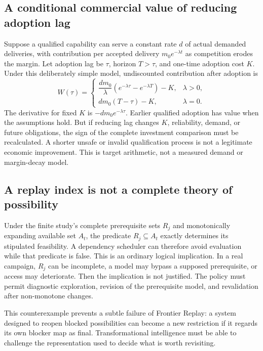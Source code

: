 \documentclass[11pt,letterpaper]{article}
\theoremstyle{remark}\newtheorem{remark}{Remark}[section]
\begin{document}
\subsection{A conditional commercial value of reducing adoption lag}
Suppose a qualified capability can serve a constant rate $d$ of actual demanded deliveries, with contribution per accepted delivery $m_0e^{-\lambda t}$ as competition erodes the margin. Let adoption lag be $\tau$, horizon $T>\tau$, and one-time adoption cost $K$. Under this deliberately simple model, undiscounted contribution after adoption is
\begin{equation}
W(\tau)=\begin{cases}
\dfrac{d m_0}{\lambda}\left(e^{-\lambda\tau}-e^{-\lambda T}\right)-K,&\lambda>0,\\[5pt]
dm_0(T-\tau)-K,&\lambda=0.
\end{cases}
\end{equation}
The derivative for fixed $K$ is $-dm_0e^{-\lambda\tau}$. Earlier qualified adoption has value when the assumptions hold. But if reducing lag changes $K$, reliability, demand, or future obligations, the sign of the complete investment comparison must be recalculated. A shorter unsafe or invalid qualification process is not a legitimate economic improvement. This is target arithmetic, not a measured demand or margin-decay model.

\subsection{A replay index is not a complete theory of possibility}
Under the finite study's complete prerequisite sets $R_j$ and monotonically expanding available set $A_t$, the predicate $R_j\subseteq A_t$ exactly determines its stipulated feasibility. A dependency scheduler can therefore avoid evaluation while that predicate is false. This is an ordinary logical implication. In a real campaign, $R_j$ can be incomplete, a model may bypass a supposed prerequisite, or access may deteriorate. Then the implication is not justified. The policy must permit diagnostic exploration, revision of the prerequisite model, and revalidation after non-monotone changes.

This counterexample prevents a subtle failure of Frontier Replay: a system designed to reopen blocked possibilities can become a new restriction if it regards its own blocker map as final. Transformational intelligence must be able to challenge the representation used to decide what is worth revisiting.
\end{document}
